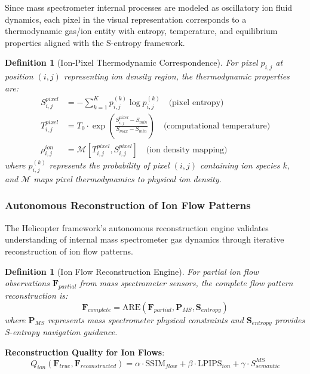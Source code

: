 \documentclass[11pt,a4paper]{article}
\newtheorem{definition}[theorem]{Definition}
\theoremstyle{remark}
\begin{document}
Since mass spectrometer internal processes are modeled as oscillatory ion fluid dynamics, each pixel in the visual representation corresponds to a thermodynamic gas/ion entity with entropy, temperature, and equilibrium properties aligned with the S-entropy framework.

\begin{definition}[Ion-Pixel Thermodynamic Correspondence]
For pixel $p_{i,j}$ at position $(i,j)$ representing ion density region, the thermodynamic properties are:
\begin{align}
S_{i,j}^{pixel} &= -\sum_{k=1}^{K} p_{i,j}^{(k)} \log p_{i,j}^{(k)} \quad \text{(pixel entropy)}\\
T_{i,j}^{pixel} &= T_0 \cdot \exp\left(\frac{S_{i,j}^{pixel} - S_{min}}{S_{max} - S_{min}}\right) \quad \text{(computational temperature)}\\
\rho_{i,j}^{ion} &= \mathcal{M}[T_{i,j}^{pixel}, S_{i,j}^{pixel}] \quad \text{(ion density mapping)}
\end{align}
where $p_{i,j}^{(k)}$ represents the probability of pixel $(i,j)$ containing ion species $k$, and $\mathcal{M}$ maps pixel thermodynamics to physical ion density.
\end{definition}

\subsubsection{Autonomous Reconstruction of Ion Flow Patterns}

The Helicopter framework's autonomous reconstruction engine validates understanding of internal mass spectrometer gas dynamics through iterative reconstruction of ion flow patterns.

\begin{definition}[Ion Flow Reconstruction Engine]
For partial ion flow observations $\mathbf{F}_{partial}$ from mass spectrometer sensors, the complete flow pattern reconstruction is:
$$\mathbf{F}_{complete} = \text{ARE}(\mathbf{F}_{partial}, \mathbf{P}_{MS}, \mathbf{S}_{entropy})$$
where $\mathbf{P}_{MS}$ represents mass spectrometer physical constraints and $\mathbf{S}_{entropy}$ provides S-entropy navigation guidance.
\end{definition}

\textbf{Reconstruction Quality for Ion Flows}:
$$Q_{ion}(\mathbf{F}_{true}, \mathbf{F}_{reconstructed}) = \alpha \cdot \text{SSIM}_{flow} + \beta \cdot \text{LPIPS}_{ion} + \gamma \cdot S_{semantic}^{MS}$$
\end{document}
